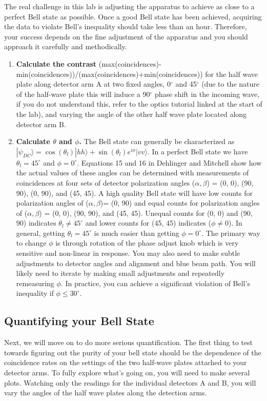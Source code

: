 \documentclass{../lab}
\begin{document}
The real challenge in this lab is adjusting the apparatus to achieve as close to a perfect Bell state as possible. Once a good Bell state has been achieved, acquiring the data to violate Bell's inequality should take less than an hour. Therefore, your success depends on the fine adjustment of the apparatus and you should approach it carefully and methodically.


\begin{enumerate}
    \item \textbf{Calculate the contrast }(max(coincidences)-min(coincidences))/(max(coincidences)+min(coincidences)) for the half wave plate along detector arm A at two fixed angles, 0$^\circ$ and 45$^\circ$ (due to the nature of the half-wave plate this will induce a 90$^\circ$ phase shift in the incoming wave, if you do not understand this, refer to the optics tutorial linked at the start of the lab), and varying the angle of the other half wave plate located along detector arm B.
    \item \textbf{Calculate $\theta$ and $\phi$.} The Bell state can generally be characterized as $|\psi_{DC}\rangle = \cos(\theta_l) |hh\rangle + \sin(\theta_l) e^{i\phi}|vv\rangle$. In a perfect Bell state we have $\theta_l=45^{\circ}$ and $\phi=0^{\circ}$. Equations 15 and 16 in Dehlinger and Mitchell\cite{Dehlinger} show how the actual values of these angles can be determined with measurements of coincidences at four sets of detector polarization angles ($\alpha,\beta$) = (0, 0), (90, 90), (0, 90), and (45, 45). A high quality Bell state will have low counts for polarization angles of ($\alpha,\beta$)= (0, 90) and equal counts for polarization angles of ($\alpha,\beta$) = (0, 0), (90, 90), and (45, 45). Unequal counts for (0, 0) and (90, 90) indicates $\theta_l\neq 45^{\circ}$ and lower counts for (45, 45) indicates ($\phi \neq 0$). In general, getting $\theta_l =45^{\circ}$ is much easier than getting $\phi=0^{\circ}$. The primary way to change $\phi$ is through rotation of the phase adjust knob which is very sensitive and non-linear in response. You may also need to make subtle adjustments to detector angles and alignment and blue beam path. You will likely need to iterate by making small adjustments and repeatedly remeasuring $\phi$. In practice, you can achieve a significant violation  of Bell's inequality if  $\phi \leq 30^{\circ}$.
\end{enumerate}



\subsection{Quantifying your Bell State}
Next, we will move on to do more serious quantification. The first thing to test towards figuring out the purity of your bell state should be the dependence of the coincidence rates on the settings of the two half-wave plates attached to your detector arms. To fully explore what's going on, you will need to make several plots. Watching only the readings for the individual detectors A and B, you will vary the angles of the half wave plates along the detection arms.
\end{document}
